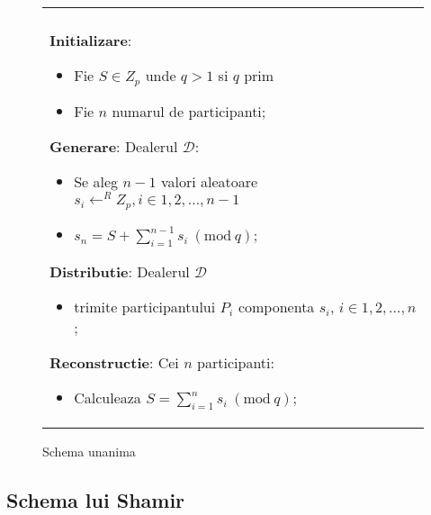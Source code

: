 \documentclass{llncs}
\newcommand{\Mod}[1]{\ (\text{mod}\ #1)}
\begin{document}
\begin{figure*}[h!]

\begin{tabular}{|p{\textwidth}|}
\hline

\\
\hspace{.1in}
\textbf{Initializare}: 
	\begin{itemize}
		\item Fie $S \in Z_p$ unde $q > 1 $ si $q$ prim
		\item Fie $n$ numarul de participanti;
	\end{itemize}
\medskip

\hspace{.1in}
\textbf{Generare}: Dealerul $\mathcal{D}$:
	\begin{itemize}
		\setlength{\itemsep}{5pt}
		\item Se aleg $n - 1$ valori aleatoare $s_i \leftarrow^R Z_p, i \in 1,2,\dots,{n-1}$
		\item $s_n = S + \sum_{i=1}^{n-1} s_i \Mod q $;
	\end{itemize}
\medskip

\hspace{.1in}
\textbf{Distributie}: Dealerul $\mathcal{D}$
	\begin{itemize}
		\item trimite participantului $P_i$ componenta $s_i$, $i \in 1,2,\dots,n$;
	\end{itemize}

\hspace{.1in}
\textbf{Reconstructie}: Cei $n$ participanti:
	\begin{itemize}
		\item Calculeaza $S = \sum_{i=1}^{n} s_i \Mod q$;
	\end{itemize}

\\
\hline
\end{tabular}
\caption{Schema unanima \cite{Karnin:83}}
\label{fig:all_or_nothing}
\end{figure*}




\subsection{Schema lui Shamir}
\end{document}
